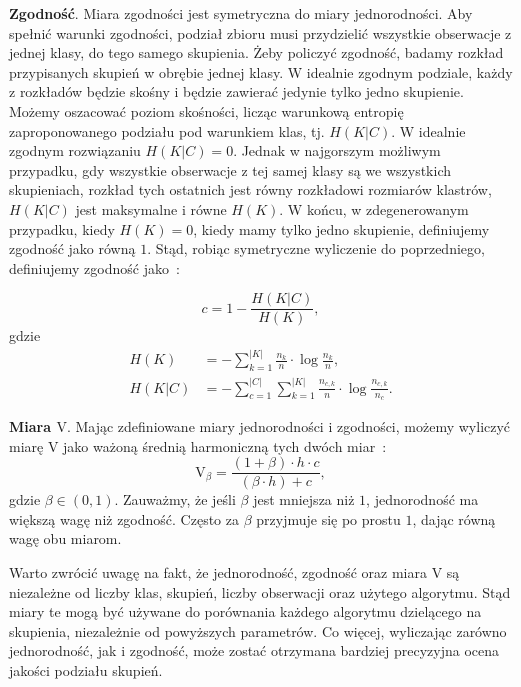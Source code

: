 \documentclass{praca1}
\begin{document}
\textbf{Zgodność}. Miara zgodności jest symetryczna do miary jednorodności. Aby spełnić warunki zgodności, podział zbioru musi przydzielić wszystkie obserwacje z jednej klasy, do tego samego skupienia. Żeby policzyć zgodność, badamy rozkład przypisanych skupień w obrębie jednej klasy. W idealnie zgodnym podziale, każdy z rozkładów będzie skośny i będzie zawierać jedynie tylko jedno skupienie. Możemy oszacować poziom skośności, licząc warunkową entropię zaproponowanego podziału pod warunkiem klas, tj. $H(K|C)$. W idealnie zgodnym rozwiązaniu $H(K|C) = 0$. Jednak w najgorszym możliwym przypadku, gdy wszystkie obserwacje z tej samej klasy są we wszystkich skupieniach, rozkład tych ostatnich jest równy rozkładowi rozmiarów klastrów, $H(K|C)$ jest maksymalne i równe $H(K)$. W końcu, w zdegenerowanym przypadku, kiedy $H(K) = 0$, kiedy mamy tylko jedno skupienie, definiujemy zgodność jako równą $1$. Stąd, robiąc symetryczne wyliczenie do poprzedniego, definiujemy zgodność jako~\cite{Rosenberg2007:vmeasure}:

\begin{equation}
c = %
1 - \frac{H(K|C)}{H(K)}, %
\end{equation}
gdzie
\begin{align*}
H(K) & = - \sum\limits_{k = 1}^{|K|}\frac{n_k}{n}\cdot \log{\frac{n_k}{n}},  \\
H(K|C) & = - \sum\limits_{c = 1}^{|C|}\sum\limits_{k = 1}^{|K|}\frac{n_{c,k}}{n}\cdot \log{\frac{n_{c,k}}{n_c}}.
\end{align*}

\textbf{Miara $\textrm{V}$}. Mając zdefiniowane miary jednorodności i zgodności, możemy wyliczyć miarę $\textrm{V}$ jako ważoną średnią harmoniczną tych dwóch miar~\cite{Rosenberg2007:vmeasure}:
\begin{equation}
\textrm{V}_{\beta} = \frac{(1+\beta)\cdot h \cdot c}{(\beta \cdot h) + c},
\end{equation}
gdzie $\beta \in (0,1)$. Zauważmy, że jeśli $\beta$ jest mniejsza niż $1$, jednorodność ma większą wagę niż zgodność. Często za $\beta$ przyjmuje się po prostu $1$, dając równą wagę obu miarom.

Warto zwrócić uwagę na fakt, że jednorodność, zgodność oraz miara V są niezależne od liczby klas, skupień, liczby obserwacji oraz użytego algorytmu. Stąd miary te mogą być używane do porównania każdego algorytmu dzielącego na skupienia, niezależnie od powyższych parametrów. Co więcej, wyliczając zarówno jednorodność, jak i zgodność, może zostać otrzymana bardziej precyzyjna ocena jakości podziału skupień.
\end{document}
